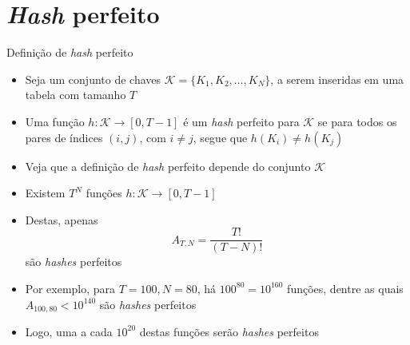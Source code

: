 \section{{\it Hash} perfeito}

\begin{frame}[fragile]{Definição de {\it hash} perfeito}

    \begin{itemize}
        \item Seja um conjunto de chaves $\mathcal{K} = \lbrace K_1, K_2, \ldots, K_N\rbrace$,
            a serem inseridas em uma tabela com tamanho $T$

        \item Uma função $h: \mathcal{K} \to [0, T-1]$ é um \textit{hash} perfeito para 
            $\mathcal{K}$ se para todos os pares de índices $(i, j)$, com $i\neq j$, 
            segue que $h(K_i) \neq h(K_j)$

        \item Veja que a definição de \textit{hash} perfeito depende do conjunto $\mathcal{K}$

        \item Existem $T^N$ funções $h: \mathcal{K}\to [0, T-1]$

        \item Destas, apenas
        \[
            A_{T,N} = \frac{T!}{(T - N)!}
        \]
        são \textit{hashes} perfeitos

        \item Por exemplo, para $T = 100, N = 80$, há $100^{80} = 10^{160}$ funções, dentre as
        quais $A_{100, 80} < 10^{140}$ são \textit{hashes} perfeitos

        \item Logo, uma a cada $10^{20}$ destas funções serão \textit{hashes} perfeitos
    \end{itemize}

\end{frame}

